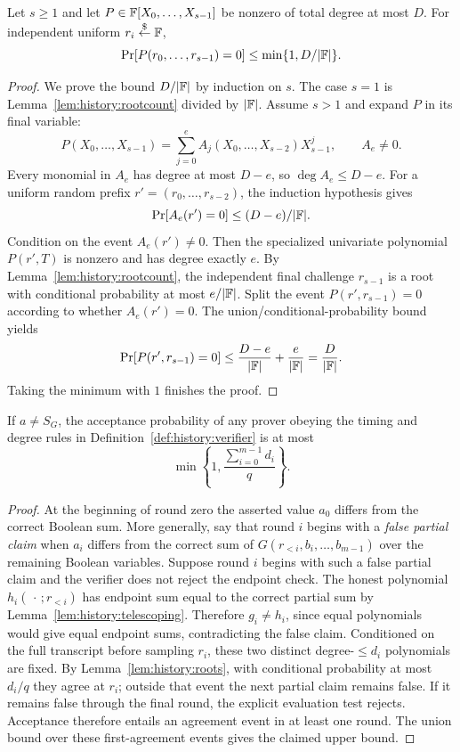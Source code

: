 \begin{lemma}\label{lem:history:schwartz-zippel}
Let $s\geq1$ and let $P\in\mathbb{F}[X_0,\ldots,X_{s-1}]$ be nonzero of total degree at most $D$. For independent uniform $r_i\overset{\$}{\leftarrow}\mathbb{F}$,
\[
 \Pr[P(r_0,\ldots,r_{s-1})=0]\leq\min\{1,D/|\mathbb{F}|\}.
\]
\end{lemma}
\begin{proof}
We prove the bound $D/|\mathbb{F}|$ by induction on $s$. The case $s=1$ is Lemma~\ref{lem:history:rootcount} divided by $|\mathbb{F}|$. Assume $s>1$ and expand $P$ in its final variable:
\[
 P(X_0,\ldots,X_{s-1})
  =\sum_{j=0}^{e}A_j(X_0,\ldots,X_{s-2})X_{s-1}^j,
 \qquad A_e\neq0.
\]
Every monomial in $A_e$ has degree at most $D-e$, so $\deg A_e\leq D-e$. For a uniform random prefix $r'=(r_0,\ldots,r_{s-2})$, the induction hypothesis gives
\[
 \Pr[A_e(r')=0]\leq(D-e)/|\mathbb{F}|.
\]
Condition on the event $A_e(r')\neq0$. Then the specialized univariate polynomial $P(r',T)$ is nonzero and has degree exactly $e$. By Lemma~\ref{lem:history:rootcount}, the independent final challenge $r_{s-1}$ is a root with conditional probability at most $e/|\mathbb{F}|$. Split the event $P(r',r_{s-1})=0$ according to whether $A_e(r')=0$. The union/conditional-probability bound yields
\[
 \Pr[P(r',r_{s-1})=0]\leq\frac{D-e}{|\mathbb{F}|}+\frac{e}{|\mathbb{F}|}=\frac D{|\mathbb{F}|}.
\]
Taking the minimum with $1$ finishes the proof.
\end{proof}

\begin{theorem}\label{thm:history:sumcheck-sound}
If $a\neq S_G$, the acceptance probability of any prover obeying the timing and degree rules in Definition~\ref{def:history:verifier} is at most
\[
 \min\left\{1,\frac{\sum_{i=0}^{m-1}d_i}{q}\right\}.
\]
\end{theorem}
\begin{proof}
At the beginning of round zero the asserted value $a_0$ differs from the correct Boolean sum. More generally, say that round $i$ begins with a \emph{false partial claim} when $a_i$ differs from the correct sum of $G(r_{<i},b_i,\ldots,b_{m-1})$ over the remaining Boolean variables.
Suppose round $i$ begins with such a false partial claim and the verifier does not reject the endpoint check. The honest polynomial $h_i(\,\cdot\,;r_{<i})$ has endpoint sum equal to the correct partial sum by Lemma~\ref{lem:history:telescoping}. Therefore $g_i\neq h_i$, since equal polynomials would give equal endpoint sums, contradicting the false claim. Conditioned on the full transcript before sampling $r_i$, these two distinct degree-$\leq d_i$ polynomials are fixed. By Lemma~\ref{lem:history:roots}, with conditional probability at most $d_i/q$ they agree at $r_i$; outside that event the next partial claim remains false. If it remains false through the final round, the explicit evaluation test rejects. Acceptance therefore entails an agreement event in at least one round. The union bound over these first-agreement events gives the claimed upper bound.
\end{proof}

